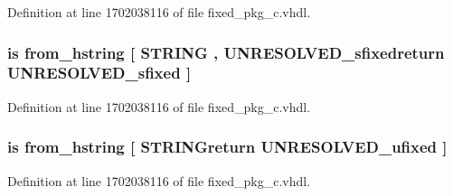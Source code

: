 Definition at line 1702038116 of file fixed\+\_\+pkg\+\_\+c.\+vhdl.

\hypertarget{classfixed__pkg_a1f47bd651be4e4193398e4a1b0bc717d}{}
\subsubsection[{from\+\_\+hex\+\_\+string}]{ {\bfseries \textcolor{keywordflow}{is}\textcolor{vhdlchar}{ }\textcolor{vhdlchar}{from\+\_\+hstring}\textcolor{vhdlchar}{ }\textcolor{vhdlchar}{\mbox{[}}\textcolor{vhdlchar}{ }\textcolor{comment}{S\+T\+R\+I\+N\+G}\textcolor{vhdlchar}{ }\textcolor{vhdlchar}{,}\textcolor{vhdlchar}{ }\textcolor{vhdlchar}{U\+N\+R\+E\+S\+O\+L\+V\+E\+D\+\_\+sfixedreturn}\textcolor{vhdlchar}{ }{\bfseries {\bf U\+N\+R\+E\+S\+O\+L\+V\+E\+D\+\_\+sfixed}} \textcolor{vhdlchar}{ }\textcolor{vhdlchar}{\mbox{]}}\textcolor{vhdlchar}{ }} \hspace{0.3cm}{\ttfamily [Alias]}}\label{classfixed__pkg_a1f47bd651be4e4193398e4a1b0bc717d}


Definition at line 1702038116 of file fixed\+\_\+pkg\+\_\+c.\+vhdl.

\hypertarget{classfixed__pkg_a45012e8233db26718c3d252d329e30c6}{}
\subsubsection[{from\+\_\+hex\+\_\+string}]{ {\bfseries \textcolor{keywordflow}{is}\textcolor{vhdlchar}{ }\textcolor{vhdlchar}{from\+\_\+hstring}\textcolor{vhdlchar}{ }\textcolor{vhdlchar}{\mbox{[}}\textcolor{vhdlchar}{ }\textcolor{vhdlchar}{S\+T\+R\+I\+N\+Greturn}\textcolor{vhdlchar}{ }{\bfseries {\bf U\+N\+R\+E\+S\+O\+L\+V\+E\+D\+\_\+ufixed}} \textcolor{vhdlchar}{ }\textcolor{vhdlchar}{\mbox{]}}\textcolor{vhdlchar}{ }} \hspace{0.3cm}{\ttfamily [Alias]}}\label{classfixed__pkg_a45012e8233db26718c3d252d329e30c6}


Definition at line 1702038116 of file fixed\+\_\+pkg\+\_\+c.\+vhdl.


